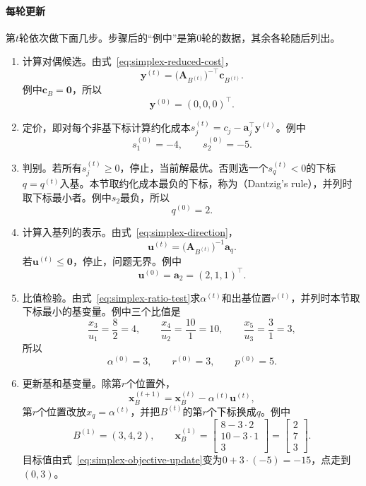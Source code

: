 \paragraph{每轮更新}
第$t$轮依次做下面几步。步骤后的“例中”是第$0$轮的数据，其余各轮随后列出。
\begin{enumerate}

 \item 计算对偶候选。由式~\eqref{eq:simplex-reduced-cost}，
 \[
  \bm{y}^{(t)}=\bigl(\bm{A}_{B^{(t)}}\bigr)^{-\top}\bm{c}_{B^{(t)}}.
 \]
 例中$\bm{c}_B=\bm{0}$，所以
 \[
  \bm{y}^{(0)}=(0,0,0)^\top.
 \]

 \item 定价，即对每个非基下标计算约化成本$s_j^{(t)}=c_j-\bm{a}_j^\top\bm{y}^{(t)}$。例中
 \[
  s_1^{(0)}=-4,\qquad s_2^{(0)}=-5.
 \]

 \item 判别。若所有$s_j^{(t)}\geq0$，停止，当前解最优。否则选一个$s_q^{(t)}<0$的下标$q=q^{(t)}$入基。本节取约化成本最负的下标，称为（Dantzig's rule），并列时取下标最小者。例中$s_2$最负，所以
 \[
  q^{(0)}=2.
 \]

 \item 计算入基列的表示。由式~\eqref{eq:simplex-direction}，
 \[
  \bm{u}^{(t)}=\bigl(\bm{A}_{B^{(t)}}\bigr)^{-1}\bm{a}_q.
 \]
 若$\bm{u}^{(t)}\leq\bm{0}$，停止，问题无界。例中
 \[
  \bm{u}^{(0)}=\bm{a}_2=(2,1,1)^\top.
 \]

 \item 比值检验。由式~\eqref{eq:simplex-ratio-test}求$\alpha^{(t)}$和出基位置$r^{(t)}$，并列时本节取下标最小的基变量。例中三个比值是
 \[
  \frac{x_3}{u_1}=\frac{8}{2}=4,\qquad
  \frac{x_4}{u_2}=\frac{10}{1}=10,\qquad
  \frac{x_5}{u_3}=\frac{3}{1}=3,
 \]
 所以
 \[
  \alpha^{(0)}=3,\qquad r^{(0)}=3,\qquad p^{(0)}=5.
 \]

 \item 更新基和基变量。除第$r$个位置外，
 \begin{equation}
  \bm{x}_B^{(t+1)}=\bm{x}_B^{(t)}-\alpha^{(t)}\bm{u}^{(t)},
  \label{eq:simplex-primal-update}
 \end{equation}
 第$r$个位置改放$x_q=\alpha^{(t)}$，并把$B^{(t)}$的第$r$个下标换成$q$。例中
 \[
  B^{(1)}=(3,4,2),\qquad \bm{x}_B^{(1)}=\begin{bmatrix}8-3\cdot2\\10-3\cdot1\\3\end{bmatrix}=\begin{bmatrix}2\\7\\3\end{bmatrix}.
 \]
 目标值由式~\eqref{eq:simplex-objective-update}变为$0+3\cdot(-5)=-15$，点走到$(0,3)$。
\end{enumerate}


